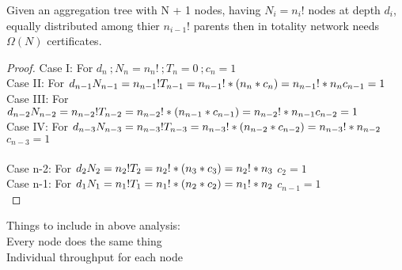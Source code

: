 \begin{theorem}
		Given an aggregation tree with N + 1 nodes, having $N_{i} = n_{i}!$ nodes at depth $d_{i}$, equally distributed among thier $n_{i-1}!$ parents then in totality network needs $\Omega(N)$ certificates.
\end{theorem}

\begin{proof}

	Case I: For $d_{n}\ ; N_{n} = n_{n}!\ ; T_{n} = 0\ ; c_{n} = 1 $\\
	Case II: For $d_{n - 1}\\ N_{n - 1} = n_{n - 1}!\\ T_{n - 1} = n_{n - 1}! * (n_{n} * c_{n}) = n_{n - 1}! * n_{n}\\ c_{n - 1} = 1\\ $
	Case III: For $d_{n - 2}\\ N_{n - 2} = n_{n - 2}!\\ T_{n -2} = n_{n - 2}! * (n_{n - 1} * c_{n - 1}) = n_{n - 2}! * n_{n - 1 } \\ c_{n - 2} = 1$\\
	Case IV: For $d_{n - 3}\\ N_{n - 3} = n_{n - 3}!\\ T_{n -3} = n_{n - 3}! * (n_{n - 2} * c_{n - 2}) = n_{n - 3}! * n_{n - 2 } \\$     $c_{n - 3} = 1$\\ \\
	Case n-2: For $d_{2}\\ N_{2} = n_{2}!\\ T_{2} = n_{2}! * (n_{3} * c_{3}) = n_{2}! * n_{3} \\$  $c_{2} = 1$\\
	Case n-1: For $d_{1}\\ N_{1} = n_{1}!\\ T_{1} = n_{1}! * (n_{2} * c_{2}) = n_{1}! * n_{2} \\$  $c_{n-1} = 1$\\

\end{proof}


Things to include in above analysis:\\
	Every node does the same thing\\
	Individual throughput for each node\\